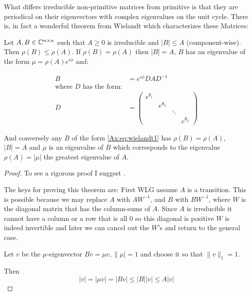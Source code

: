 What differs irreducible non-primitive matrices from primitive is
that they are periodical on their eigenvectors with complex eigenvalues
on the unit cycle. There is, in fact a wonderful theorem from Wielandt which
characterizes these Matrices:

\begin{thm}[Wielandt (1950)]
\label{Ax:thm:wielandt}
Let $A,B \in \mathbb{C}^{n \times n}$ such that $A \geq 0$ is irreducible and $|B| \leq
A$ (component-wise). Then $\rho(B) \leq \rho(A)$.
If $\rho(B)=\rho(A)$ then $|B|=A$, $B$ has an eigenvalue of the form $\mu =
\rho(A)e^{i \phi}$ and:

\begin{equation}
\begin{aligned}
\label{Ax:eq:wielandt1}
B &= 
e^{i \phi}DAD^{-1} \\ 
\text{where } D \text{ has the form:}\\
D &= 
\begin{pmatrix}
e^{\theta_1} & & & \\
& e^{\theta_2} & & \\
& & \ddots & \\
& & & e^{\theta_2}
\end{pmatrix}
\end{aligned}
\end{equation}

And conversely any $B$ of the form \ref{Ax:eq:wielandt1}
has $\rho(B) = \rho(A)$, $|B|=A$ and $\mu$ is an eigenvalue of $B$ which
corresponds to the eigenvalue $\rho(A)=|\mu|$ the greatest eigenvalue of $A$.

\begin{proof}
To see a rigorous proof I suggest \textcite{meyer2000matrix}.

The keys for proving this theorem are:
First WLG assume $A$ is a transition. This is possible because we may replace
$A$ with $AW^{-1}$, and $B$ with
$BW^{-1}$, where $W$ is the diagonal matrix that has the column-sums of $A$.
Since $A$ is irreducible it cannot have a column or a row that is all $0$
so this diagonal is positive $W$ is indeed invertible and later we can cancel out the
$W$'s and return to the general case.

Let $v$ be the $\mu$-eigenvector $Bv = \mu v, \|\mu|=1$ and choose it so that 
$\|v\|_1=1$.

Then 
\begin{equation}
|v| = |\mu v| = |B v| \leq |B| |v|
\leq A |v|
\end{equation}


\end{proof}
\end{thm}
